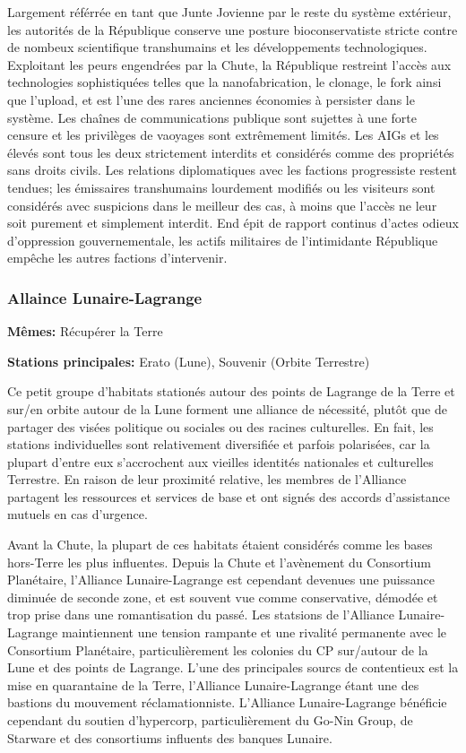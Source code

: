 Largement référrée en tant que Junte Jovienne par le reste du système extérieur, les autorités de la République conserve une posture bioconservatiste stricte contre de nombeux scientifique transhumains et les développements technologiques. Exploitant les peurs engendrées par la Chute, la République restreint l'accès aux technologies sophistiquées telles que la nanofabrication, le clonage, le fork ainsi que l'upload, et est l'une des rares anciennes économies à persister dans le système. Les chaînes de communications publique sont sujettes à une forte censure et les privilèges de vaoyages sont extrêmement limités. Les AIGs et les élevés sont tous les deux strictement interdits et considérés comme des propriétés sans droits civils. Les relations diplomatiques avec les factions progressiste restent tendues; les émissaires transhumains lourdement modifiés ou les visiteurs sont considérés avec suspicions dans le meilleur des cas, à moins que l'accès ne leur soit purement et simplement interdit. End épit de rapport continus d'actes odieux d'oppression gouvernementale, les actifs militaires de l'intimidante République empêche les autres factions d'intervenir. 

\subsubsection{Allaince Lunaire-Lagrange} \label{sec:lunar-lagr-alli} 

\textbf{Mêmes:} Récupérer la Terre 

\textbf{Stations principales:} Erato (Lune), Souvenir (Orbite Terrestre) 

Ce petit groupe d'habitats stationés autour des points de Lagrange de la Terre et sur/en orbite autour de la Lune forment une alliance de nécessité, plutôt que de partager des visées politique ou sociales ou des racines culturelles. En fait, les stations individuelles sont relativement diversifiée et parfois polarisées, car la plupart d'entre eux s'accrochent aux vieilles identités nationales et culturelles Terrestre. En raison de leur proximité relative, les membres de l'Alliance partagent les ressources et services de base et ont signés des accords d'assistance mutuels en cas d'urgence. 

Avant la Chute, la plupart de ces habitats étaient considérés comme les bases hors-Terre les plus influentes. Depuis la Chute et l'avènement du Consortium Planétaire, l'Alliance Lunaire-Lagrange est cependant devenues une puissance diminuée de seconde zone, et est souvent vue comme conservative, démodée et trop prise dans une romantisation du passé. Les statsions de l'Alliance Lunaire-Lagrange maintiennent une tension rampante et une rivalité permanente avec le Consortium Planétaire, particulièrement les colonies du CP sur/autour de la Lune et des points de Lagrange. L'une des principales sourcs de contentieux est la mise en quarantaine de la Terre, l'Alliance Lunaire-Lagrange étant une des bastions du mouvement réclamationniste. L'Alliance Lunaire-Lagrange bénéficie cependant du soutien d'hypercorp, particulièrement du Go-Nin Group, de Starware et des consortiums influents des banques Lunaire. 

